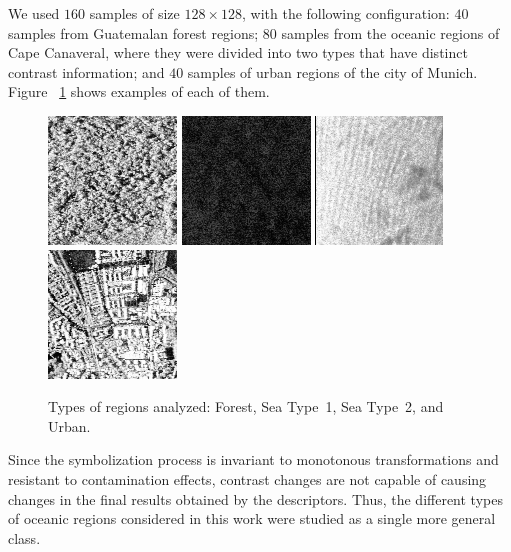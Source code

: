 \documentclass{isprs}
\begin{document}
We used $160$ samples of size $128\times128$, with the following configuration:
$40$ samples from Guatemalan forest regions;
$80$ samples from the oceanic regions of Cape Canaveral, where they were divided into two types that have distinct contrast information; and
$40$ samples of urban regions of the city of Munich.
Figure ~\ref{fig:RegionsSAR} shows examples of each of them.

\begin{figure}[hbt]
	\centering
	\includegraphics[width=.23\linewidth]{Figures/guatemalaflorest}
	\includegraphics[width=.23\linewidth]{Figures/Cape1}
	\includegraphics[width=.23\linewidth]{Figures/Cape2}
	\includegraphics[width=.23\linewidth]{Figures/munichUrban}	
	\caption{Types of regions analyzed: Forest, Sea Type~1, Sea Type~2, and Urban.}\label{fig:RegionsSAR}
\end{figure} 

Since the symbolization process is invariant to monotonous transformations and resistant to contamination effects, contrast chan\-ges are not capable of causing changes in the final results obtained by the descriptors.
Thus, the different types of oceanic regions considered in this work were studied as a single more general class.
\end{document}
